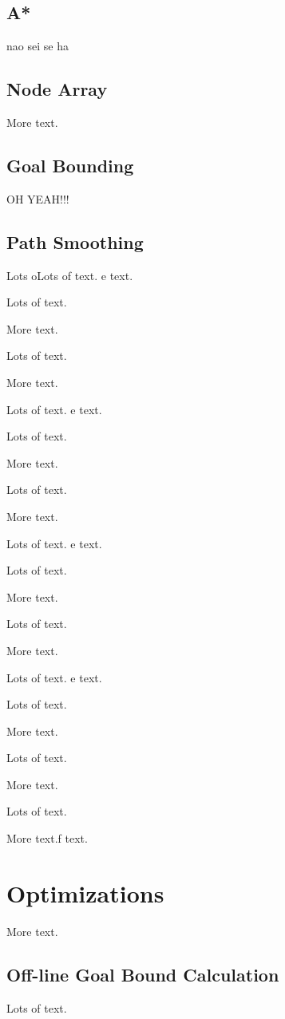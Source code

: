 \documentclass{sigplanconf}[10pt]
\begin{document}
\subsection{A*}
nao sei se ha

\subsection{Node Array}

More text.

\subsection{Goal Bounding}
OH YEAH!!!

\subsection{Path Smoothing}

Lots oLots of text.
e text.

Lots of text.

More text.

Lots of text.

More text.

Lots of text.
e text.

Lots of text.

More text.

Lots of text.

More text.

Lots of text.
e text.

Lots of text.

More text.

Lots of text.

More text.

Lots of text.
e text.

Lots of text.

More text.

Lots of text.

More text.

Lots of text.

More text.f text.


\section{Optimizations}
\label{optimi}
More text.
\subsection{Off-line Goal Bound Calculation}
Lots of text.
\end{document}
